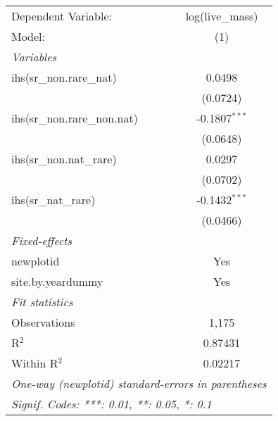 \begin{tabular}{lc}
\tabularnewline\midrule\midrule
Dependent Variable:&log(live\_mass)\\
Model:&(1)\\
\midrule \emph{Variables}&  \\
ihs(sr\_non.rare\_nat)&0.0498\\
  &(0.0724)\\
ihs(sr\_non.rare\_non.nat)&-0.1807$^{***}$\\
  &(0.0648)\\
ihs(sr\_non.nat\_rare)&0.0297\\
  &(0.0702)\\
ihs(sr\_nat\_rare)&-0.1432$^{***}$\\
  &(0.0466)\\
\midrule \emph{Fixed-effects}&  \\
newplotid & Yes\\
site.by.yeardummy & Yes\\
\midrule \emph{Fit statistics}&  \\
Observations & 1,175\\
R$^2$ & 0.87431\\
Within R$^2$ & 0.02217\\
\midrule\midrule\multicolumn{2}{l}{\emph{One-way (newplotid) standard-errors in parentheses}}\\
\multicolumn{2}{l}{\emph{Signif. Codes: ***: 0.01, **: 0.05, *: 0.1}}\\
\end{tabular}


